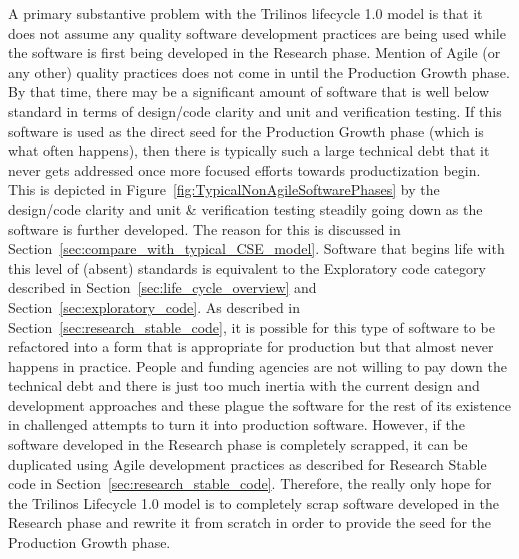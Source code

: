 \documentclass[11pt]{SANDreport}
\begin{document}
A primary substantive problem with the Trilinos lifecycle 1.0 model is that it does not assume any quality software development practices are being used while the software is first being developed in the Research phase.  Mention of Agile (or any other) quality practices does not come in until the Production Growth phase.  By that time, there may be a significant amount of software that is well below standard in terms of design/code clarity and unit and verification testing.  If this software is used as the direct seed for the Production Growth phase (which is what often happens), then there is typically such a large technical debt that it never gets addressed once more focused efforts towards productization begin.  This is depicted in Figure~\ref{fig:TypicalNonAgileSoftwarePhases} by the design/code clarity and unit \& verification testing steadily going down as the software is further developed.  The reason for this is discussed in Section~\ref{sec:compare_with_typical_CSE_model}.  Software that begins life with this level of (absent) standards is equivalent to the Exploratory code category described in Section~\ref{sec:life_cycle_overview} and Section~\ref{sec:exploratory_code}.  As described in Section~\ref{sec:research_stable_code}, it is possible for this type of software to be refactored into a form that is appropriate for production but that almost never happens in practice.  People and funding agencies are not willing to pay down the technical debt and there is just too much inertia with the current design and development approaches and these plague the software for the rest of its existence in challenged attempts to turn it into production software.  However, if the software developed in the Research phase is completely scrapped, it can be duplicated using Agile development practices as described for Research Stable code in Section~\ref{sec:research_stable_code}.  Therefore, the really only hope for the Trilinos Lifecycle 1.0 model is to completely scrap software developed in the Research phase and rewrite it from scratch in order to provide the seed for the Production Growth phase.
\end{document}
